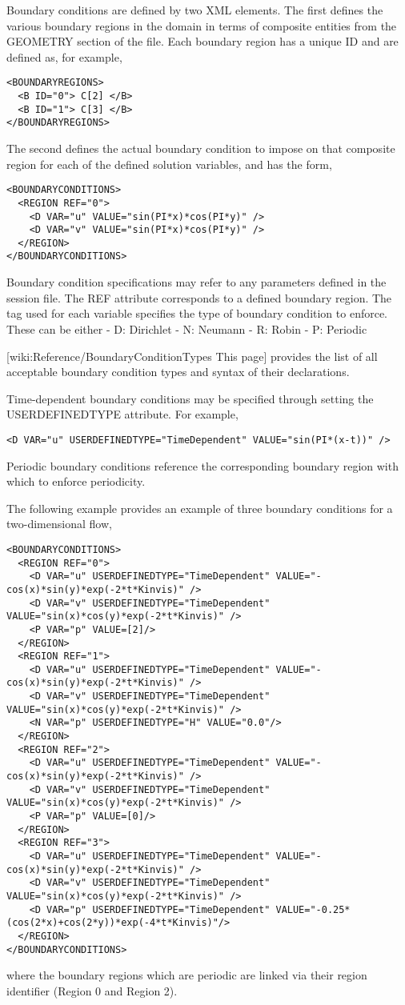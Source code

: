 Boundary conditions are defined by two XML elements. The first defines the various boundary regions in the domain in terms of composite entities from the GEOMETRY section of the file. Each boundary region has a unique ID and are defined as, for example,
\begin{lstlisting}[style=XMLStyle]
<BOUNDARYREGIONS>
  <B ID="0"> C[2] </B>
  <B ID="1"> C[3] </B>
</BOUNDARYREGIONS>
\end{lstlisting}
The second defines the actual boundary condition to impose on that composite region for each of the defined solution variables, and has the form,
\begin{lstlisting}[style=XMLStyle]
<BOUNDARYCONDITIONS>
  <REGION REF="0">
    <D VAR="u" VALUE="sin(PI*x)*cos(PI*y)" />
    <D VAR="v" VALUE="sin(PI*x)*cos(PI*y)" />
  </REGION>
</BOUNDARYCONDITIONS>
\end{lstlisting}
Boundary condition specifications may refer to any parameters defined in the session file. The REF attribute corresponds to a defined boundary region. The tag used for each variable specifies the type of boundary condition to enforce. These can be either
 - D: Dirichlet
 - N: Neumann
 - R: Robin
 - P: Periodic

[wiki:Reference/BoundaryConditionTypes This page] provides the list of all acceptable boundary condition types and syntax of their declarations.

Time-dependent boundary conditions may be specified through setting the USERDEFINEDTYPE attribute. For example,
\begin{lstlisting}[style=XMLStyle]
<D VAR="u" USERDEFINEDTYPE="TimeDependent" VALUE="sin(PI*(x-t))" />
\end{lstlisting}
Periodic boundary conditions reference the corresponding boundary region with which to enforce periodicity.

The following example provides an example of three boundary conditions for a two-dimensional flow,
\begin{lstlisting}[style=XMLStyle]
<BOUNDARYCONDITIONS>
  <REGION REF="0">
    <D VAR="u" USERDEFINEDTYPE="TimeDependent" VALUE="-cos(x)*sin(y)*exp(-2*t*Kinvis)" />
    <D VAR="v" USERDEFINEDTYPE="TimeDependent" VALUE="sin(x)*cos(y)*exp(-2*t*Kinvis)" />
    <P VAR="p" VALUE=[2]/>
  </REGION>
  <REGION REF="1">
    <D VAR="u" USERDEFINEDTYPE="TimeDependent" VALUE="-cos(x)*sin(y)*exp(-2*t*Kinvis)" />
    <D VAR="v" USERDEFINEDTYPE="TimeDependent" VALUE="sin(x)*cos(y)*exp(-2*t*Kinvis)" />
    <N VAR="p" USERDEFINEDTYPE="H" VALUE="0.0"/>
  </REGION>
  <REGION REF="2">
    <D VAR="u" USERDEFINEDTYPE="TimeDependent" VALUE="-cos(x)*sin(y)*exp(-2*t*Kinvis)" />
    <D VAR="v" USERDEFINEDTYPE="TimeDependent" VALUE="sin(x)*cos(y)*exp(-2*t*Kinvis)" />
    <P VAR="p" VALUE=[0]/>
  </REGION>
  <REGION REF="3">
    <D VAR="u" USERDEFINEDTYPE="TimeDependent" VALUE="-cos(x)*sin(y)*exp(-2*t*Kinvis)" />
    <D VAR="v" USERDEFINEDTYPE="TimeDependent" VALUE="sin(x)*cos(y)*exp(-2*t*Kinvis)" />
    <D VAR="p" USERDEFINEDTYPE="TimeDependent" VALUE="-0.25*(cos(2*x)+cos(2*y))*exp(-4*t*Kinvis)"/>
  </REGION>
</BOUNDARYCONDITIONS>
\end{lstlisting}
where the boundary regions which are periodic are linked via their region identifier (Region 0 and Region 2).

